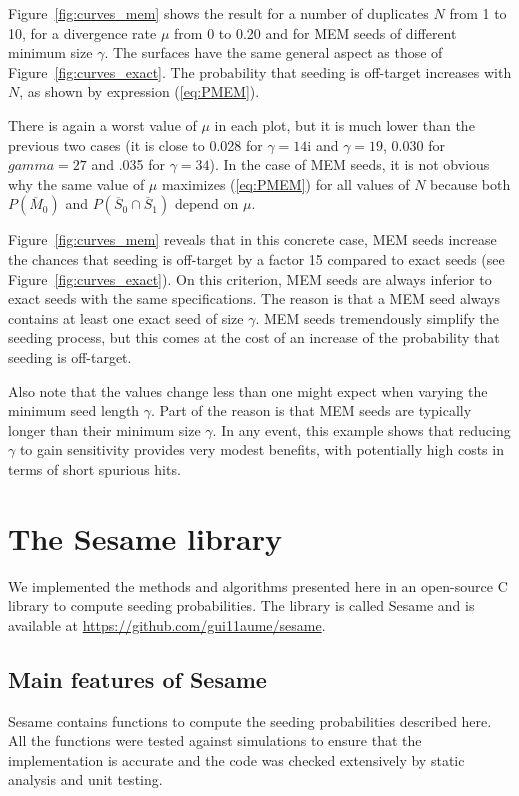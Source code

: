 \documentclass{article}
\begin{document}
Figure~\ref{fig:curves_mem} shows the result for a number of duplicates
$N$ from 1 to 10, for a divergence rate $\mu$ from 0 to 0.20 and for MEM
seeds of different minimum size $\gamma$. The surfaces have the same
general aspect as those of Figure~\ref{fig:curves_exact}. The probability
that seeding is off-target increases with $N$, as shown by expression
(\ref{eq:PMEM}).

There is again a  worst value of $\mu$ in each plot, but it is much lower
than the previous two cases (it is close to 0.028 for $\gamma=14$i and
$\gamma=19$, 0.030 for $gamma=27$ and .035 for $\gamma=34$). In the case
of MEM seeds, it is not obvious why the same value of $\mu$ maximizes
(\ref{eq:PMEM}) for all values of $N$ because both $P(\overline{M}_0)$ and
$P(\overline{S}_0 \cap \overline{S}_1)$ depend on $\mu$.

Figure~\ref{fig:curves_mem} reveals that in this concrete case, MEM seeds
increase the chances that seeding is off-target by a factor 15
compared to exact seeds (see Figure~\ref{fig:curves_exact}). On this
criterion, MEM seeds are always inferior to exact seeds with the same
specifications. The reason is that a MEM seed always contains at least one
exact seed of size $\gamma$. MEM seeds tremendously simplify the seeding
process, but this comes at the cost of an increase of the probability that
seeding is off-target.

Also note that the values change less than one might expect when varying
the minimum seed length $\gamma$. Part of the reason is that MEM seeds are
typically longer than their minimum size $\gamma$. In any event, this
example shows that reducing $\gamma$ to gain sensitivity provides very
modest benefits, with potentially high costs in terms of short spurious
hits.


\section{The Sesame library}
\label{sec:sesame}

We implemented the methods and algorithms presented here in an open-source
C library to compute seeding probabilities. The library is called Sesame
and is available at \url{https://github.com/gui11aume/sesame}.

\subsection{Main features of Sesame}

Sesame contains functions to compute the seeding probabilities described
here. All the functions were tested against simulations to ensure that the
implementation is accurate and the code was checked extensively by static
analysis and unit testing.
\end{document}
